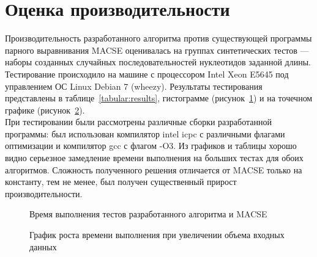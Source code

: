 \newpage

\section[Оценка производительности]{\large \centering Оценка производительности}
\hspace{\parindent} Производительность разработанного алгоритма против существующей программы парного выравнивания MACSE оценивалась на группах синтетических тестов --- наборы созданных случайных последовательностей нуклеотидов заданной длины. Тестирование происходило на машине с процессором Intel Xeon E5645 под управлением ОС Linux Debian 7 (wheezy). Результаты тестирования представлены в таблице~\ref{tabular:results}, гистограмме (рисунок~\ref{ris:gist}) и на точечном графике (рисунок~\ref{ris:3D}).\\
\indent При тестировании были рассмотрены различные сборки разработанной программы: был использован компилятор intel icpc с различными флагами оптимизации и компилятор gcc с флагом -O3. Из графиков и таблицы хорошо видно серьезное замедление времени выполнения на больших тестах для обоих алгоритмов. Сложность полученного решения отличается от MACSE только на константу, тем не менее, был получен существенный прирост производительности.

\begin{figure}[h]
	\caption{Время выполнения тестов разработанного алгоритма и MACSE}
	\label{ris:gist}
\end{figure}
\begin{figure}[h]
	\caption{График роста времени выполнения при увеличении объема входных данных}
	\label{ris:3D}
\end{figure}

